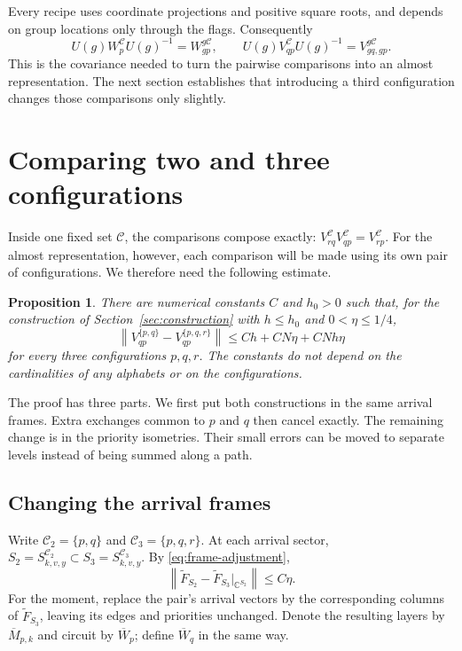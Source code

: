 \documentclass[11pt]{article}
\numberwithin{equation}{section}
\newtheorem{proposition}[theorem]{Proposition}
\theoremstyle{definition}
\theoremstyle{remark}
\newcommand{\norm}[1]{\left\lVert#1\right\rVert}
\newcommand{\cC}{\mathcal C}
\begin{document}
Every recipe uses coordinate projections and positive square roots, and
depends on group locations only through the flags. Consequently
\begin{equation}\label{eq:equivariance}
 U(g)W_p^{\cC}U(g)^{-1}=W_{gp}^{g\cC},
 \qquad U(g)V_{qp}^{\cC}U(g)^{-1}=V_{gq,gp}^{g\cC}.
\end{equation}
This is the covariance needed to turn the pairwise comparisons into an
almost representation. The next section establishes that introducing a
third configuration changes those comparisons only slightly.

\section{Comparing two and three configurations}\label{sec:comparison}

Inside one fixed set $\cC$, the comparisons compose exactly:
$V_{rq}^{\cC}V_{qp}^{\cC}=V_{rp}^{\cC}$. For the almost representation,
however, each comparison will be made using its own pair of configurations.
We therefore need the following estimate.

\begin{proposition}\label{prop:comparison}
There are numerical constants $C$ and $h_0>0$ such that, for the construction
of Section~\ref{sec:construction} with $h\le h_0$ and $0<\eta\le1/4$,
\begin{equation}\label{eq:comparison}
 \norm{V_{qp}^{\{p,q\}}-V_{qp}^{\{p,q,r\}}}
 \le Ch+CN\eta+CNh\eta
\end{equation}
for every three configurations $p,q,r$. The constants do not depend on
the cardinalities of any alphabets or on the configurations.
\end{proposition}

The proof has three parts. We first put both constructions in the same
arrival frames. Extra exchanges common to $p$ and $q$ then cancel exactly.
The remaining change is in the priority isometries. Their small errors can
be moved to separate levels instead of being summed along a path.

\subsection{Changing the arrival frames}
Write $\cC_2=\{p,q\}$ and $\cC_3=\{p,q,r\}$. At each arrival sector,
$S_2=S_{k,v,y}^{\cC_2}\subset S_3=S_{k,v,y}^{\cC_3}$. By
\eqref{eq:frame-adjustment},
\begin{equation}\label{eq:two-frame-distance}
 \norm{\widetilde F_{S_2}-\widetilde F_{S_3}|_{\mathbb C^{S_2}}}
 \le C\eta.
\end{equation}
For the moment, replace the pair's arrival vectors by the corresponding
columns of $\widetilde F_{S_3}$, leaving its edges and priorities unchanged.
Denote the resulting layers by $\overline M_{p,k}$ and circuit by
$\overline W_p$; define $\overline W_q$ in the same way.
\end{document}
